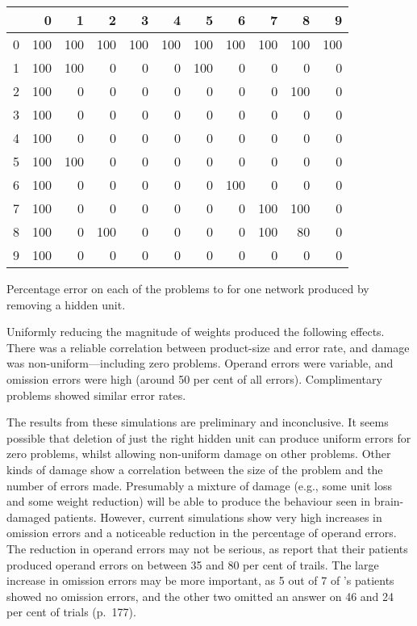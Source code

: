 \begin{fancytable}
\begin{center}
\begin{tabular}{r|rrrrrrrrrr}
&
      0 &   1 &   2 &   3 &   4 &   5 &   6 &   7 &   8 &   9\\
\hline
0 & 100 & 100 & 100 & 100 & 100 & 100 & 100 & 100 & 100 & 100\\
1 & 100 & 100 &   0 &   0 &   0 & 100 &   0 &   0 &   0 &   0\\
2 & 100 &   0 &   0 &   0 &   0 &   0 &   0 &   0 & 100 &   0\\
3 & 100 &   0 &   0 &   0 &   0 &   0 &   0 &   0 &   0 &   0\\
4 & 100 &   0 &   0 &   0 &   0 &   0 &   0 &   0 &   0 &   0\\
5 & 100 & 100 &   0 &   0 &   0 &   0 &   0 &   0 &   0 &   0\\
6 & 100 &   0 &   0 &   0 &   0 &   0 & 100 &   0 &   0 &   0\\
7 & 100 &   0 &   0 &   0 &   0 &   0 &   0 & 100 & 100 &   0\\
8 & 100 &   0 & 100 &   0 &   0 &   0 &   0 & 100 &  80 &   0\\
9 & 100 &   0 &   0 &   0 &   0 &   0 &   0 &   0 &   0 &   0\\
\end{tabular}
\end{center}
\caption{Percentage error on each of the problems  to  for one
network produced by removing a hidden unit.}
\label{f:unitdam}
\end{fancytable}

Uniformly reducing the magnitude of weights produced the following effects.
There was a reliable correlation between product-size and error rate, and
damage was non-uniform---including zero problems. Operand errors were
variable, and omission errors were high (around 50 per cent of all errors).
Complimentary problems showed similar error rates.


The results from these simulations are preliminary and inconclusive.  It
seems possible that deletion of just the right hidden unit can produce
uniform errors for zero problems, whilst allowing non-uniform damage on
other problems.  Other kinds of damage show a correlation between the size
of the problem and the number of errors made.  Presumably a mixture of
damage (e.g., some
unit loss and some weight reduction) will be able to produce
the behaviour seen in brain-damaged patients.  However, current simulations
show very high increases in omission errors and a noticeable reduction in
the percentage of operand errors. The reduction in operand errors may not
be serious, as  report that their patients produced operand
errors on between 35 and 80 per cent of trails.  The large increase in
omission errors may be more important, as 5 out of 7 of
\citeauthor{mcclfact}'s patients showed no omission errors, and the other
two omitted an answer on 46 and 24 per cent of trials (p.~177).

